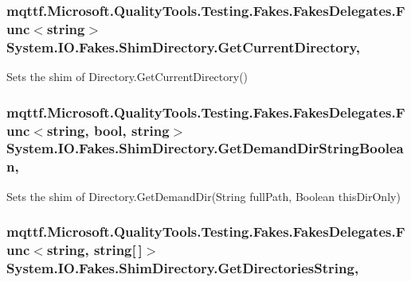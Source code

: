 \hypertarget{class_system_1_1_i_o_1_1_fakes_1_1_shim_directory_a6ab2a25b3fea5418567aa4477c221dd4}{
\subsubsection[{Get\-Current\-Directory}]{\setlength{\rightskip}{0pt plus 5cm}mqttf.\-Microsoft.\-Quality\-Tools.\-Testing.\-Fakes.\-Fakes\-Delegates.\-Func$<$string$>$ System.\-I\-O.\-Fakes.\-Shim\-Directory.\-Get\-Current\-Directory\hspace{0.3cm}{\ttfamily [static]}, {\ttfamily [set]}}}\label{class_system_1_1_i_o_1_1_fakes_1_1_shim_directory_a6ab2a25b3fea5418567aa4477c221dd4}


Sets the shim of Directory.\-Get\-Current\-Directory()

\hypertarget{class_system_1_1_i_o_1_1_fakes_1_1_shim_directory_a2be23a0f6f88b70784a5ce9b7ed888e6}{
\subsubsection[{Get\-Demand\-Dir\-String\-Boolean}]{\setlength{\rightskip}{0pt plus 5cm}mqttf.\-Microsoft.\-Quality\-Tools.\-Testing.\-Fakes.\-Fakes\-Delegates.\-Func$<$string, bool, string$>$ System.\-I\-O.\-Fakes.\-Shim\-Directory.\-Get\-Demand\-Dir\-String\-Boolean\hspace{0.3cm}{\ttfamily [static]}, {\ttfamily [set]}}}\label{class_system_1_1_i_o_1_1_fakes_1_1_shim_directory_a2be23a0f6f88b70784a5ce9b7ed888e6}


Sets the shim of Directory.\-Get\-Demand\-Dir(\-String full\-Path, Boolean this\-Dir\-Only)

\hypertarget{class_system_1_1_i_o_1_1_fakes_1_1_shim_directory_ac57351a4a8e6a56e5467f8d40e3feb4d}{
\subsubsection[{Get\-Directories\-String}]{\setlength{\rightskip}{0pt plus 5cm}mqttf.\-Microsoft.\-Quality\-Tools.\-Testing.\-Fakes.\-Fakes\-Delegates.\-Func$<$string, string\mbox{[}$\,$\mbox{]}$>$ System.\-I\-O.\-Fakes.\-Shim\-Directory.\-Get\-Directories\-String\hspace{0.3cm}{\ttfamily [static]}, {\ttfamily [set]}}}\label{class_system_1_1_i_o_1_1_fakes_1_1_shim_directory_ac57351a4a8e6a56e5467f8d40e3feb4d}


